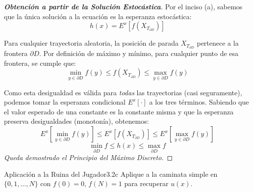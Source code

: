 \documentclass[10pt,a4paper]{article}
\begin{document}
\begin{proof}[\textbf{Obtención a partir de la Solución Estocástica}]
    Por el inciso (a), sabemos que la única solución a la ecuación es la esperanza estocástica:
    \[ h(x) = E^x[f(X_{T_{\partial D}})] \]
    
    Para cualquier trayectoria aleatoria, la posición de parada $X_{T_{\partial D}}$ pertenece a la frontera $\partial D$. 
    Por definición de máximo y mínimo, para cualquier punto de esa frontera, se cumple que:
    \[ \min_{y \in \partial D} f(y) \le f(X_{T_{\partial D}}) \le \max_{y \in \partial D} f(y) \]
    
    Como esta desigualdad es válida para \textit{todas} las trayectorias (casi seguramente), podemos tomar la esperanza condicional $E^x[\cdot]$ a los tres términos. Sabiendo que el valor esperado de una constante es la constante misma y que la esperanza preserva desigualdades (monotonía), obtenemos:
    \[ E^x \left[ \min_{y \in \partial D} f(y) \right] \le E^x \left[ f(X_{T_{\partial D}}) \right] \le E^x \left[ \max_{y \in \partial D} f(y) \right] \]
    \[ \min_{\partial D} f \le h(x) \le \max_{\partial D} f \]
    \textit{Queda demostrado el Principio del Máximo Discreto.}
\end{proof}

\newpage

\begin{ejercicio}{Aplicación a la Ruina del Jugador}{3.2c}
    Aplique a la caminata simple en $\{0, 1, \dots, N\}$ con $f(0) = 0$, $f(N) = 1$ para recuperar $u(x)$.
\end{ejercicio}
\end{document}
